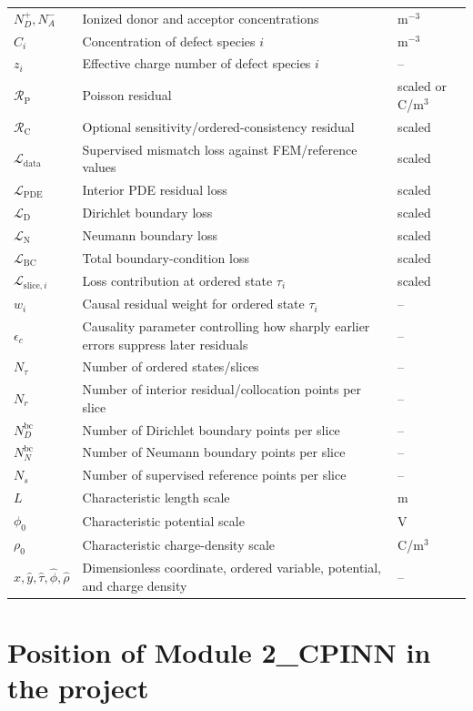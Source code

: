 \documentclass[11pt]{article}
\newcommand{\Rpoisson}{\mathcal{R}_{\mathrm{P}}}
\newcommand{\Rcausal}{\mathcal{R}_{\mathrm{C}}}
\newcommand{\Ldata}{\mathcal{L}_{\mathrm{data}}}
\newcommand{\Lpde}{\mathcal{L}_{\mathrm{PDE}}}
\newcommand{\Lbc}{\mathcal{L}_{\mathrm{BC}}}
\newcommand{\Ldir}{\mathcal{L}_{\mathrm{D}}}
\newcommand{\Lneu}{\mathcal{L}_{\mathrm{N}}}
\newcommand{\taud}{\tau}
\begin{document}
\begin{longtable}{p{} p{} p{}}
$N_D^+,N_A^-$ & Ionized donor and acceptor concentrations & m$^{-3}$ \\
$C_i$ & Concentration of defect species $i$ & m$^{-3}$ \\
$z_i$ & Effective charge number of defect species $i$ & -- \\
$\Rpoisson$ & Poisson residual & scaled or C/m$^3$ \\
$\Rcausal$ & Optional sensitivity/ordered-consistency residual & scaled \\
$\Ldata$ & Supervised mismatch loss against FEM/reference values & scaled \\
$\Lpde$ & Interior PDE residual loss & scaled \\
$\Ldir$ & Dirichlet boundary loss & scaled \\
$\Lneu$ & Neumann boundary loss & scaled \\
$\Lbc$ & Total boundary-condition loss & scaled \\
$\mathcal{L}_{\mathrm{slice},i}$ & Loss contribution at ordered state $\taud_i$ & scaled \\
$w_i$ & Causal residual weight for ordered state $\taud_i$ & -- \\
$\epsilon_c$ & Causality parameter controlling how sharply earlier errors suppress later residuals & -- \\
$N_\taud$ & Number of ordered states/slices & -- \\
$N_r$ & Number of interior residual/collocation points per slice & -- \\
$N_D^{\mathrm{bc}}$ & Number of Dirichlet boundary points per slice & -- \\
$N_N^{\mathrm{bc}}$ & Number of Neumann boundary points per slice & -- \\
$N_s$ & Number of supervised reference points per slice & -- \\
$L$ & Characteristic length scale & m \\
$\phi_0$ & Characteristic potential scale & V \\
$\rho_0$ & Characteristic charge-density scale & C/m$^3$ \\
$\hat{x},\hat{y},\hat{\taud},\hat{\phi},\hat{\rho}$ & Dimensionless coordinate, ordered variable, potential, and charge density & -- \\
\bottomrule
\end{longtable}

\section{Position of Module 2\_CPINN in the project}
\end{document}
